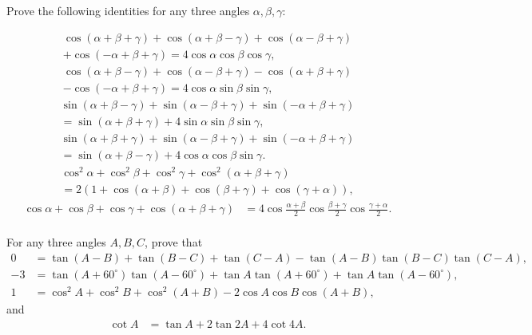 \documentclass[12pt,a4paper]{memoir}
\theoremstyle{definition}
\begin{document}
\begin{question}
	Prove the following identities for any three angles $\alpha, \beta, \gamma$:
	\begin{tasks}
		\task \begin{multline*}
			\cos(\alpha+\beta+\gamma)+\cos(\alpha+\beta-\gamma)+\cos(\alpha-\beta+\gamma)\\+\cos(-\alpha+\beta+\gamma)  = 4\cos \alpha \cos \beta \cos \gamma,
		\end{multline*}
		\task \begin{multline*}
			\cos(\alpha+\beta-\gamma)+\cos(\alpha-\beta+\gamma)-\cos(\alpha+\beta+\gamma) \\- \cos(-\alpha+\beta+\gamma) = 4\cos \alpha \sin \beta \sin \gamma,
		\end{multline*}
		\task \begin{multline*}
			\sin(\alpha+\beta-\gamma)+\sin(\alpha-\beta+\gamma)+\sin(-\alpha+\beta+\gamma) \\= \sin(\alpha+\beta+\gamma) + 4\sin \alpha \sin \beta \sin \gamma,
		\end{multline*}
		\task \begin{multline*}
			\sin(\alpha+\beta+\gamma)+\sin(\alpha-\beta+\gamma)+\sin(-\alpha+\beta+\gamma) \\= \sin(\alpha+\beta-\gamma) + 4\cos \alpha \cos \beta \sin \gamma.
		\end{multline*}
		\task \begin{multline*}
			\cos^2 \alpha + \cos^2 \beta + \cos^2 \gamma + \cos^2(\alpha+\beta+\gamma) \\= 2\left(1+\cos(\alpha+\beta)+\cos(\beta+\gamma)+\cos(\gamma+\alpha)\right),
		\end{multline*}
		\task \begin{align*}
			\cos \alpha + \cos \beta + \cos \gamma + \cos(\alpha+\beta+\gamma) &= 4\cos\frac{\alpha+\beta}{2}\cos\frac{\beta+\gamma}{2}\cos\frac{\gamma+\alpha}{2}.\\
		\end{align*}
	\end{tasks}
\end{question}


\begin{question}
	For any three angles $A,B,C$, prove that
	\begin{align*}
		0  &= \tan(A-B)+\tan(B-C)+\tan(C-A)-\tan(A-B)\tan(B-C)\tan(C-A),\\
		-3 &= \tan(A+60^{\circ})\tan(A-60^{\circ}) + \tan A \tan(A+60^{\circ}) + \tan A \tan(A-60^{\circ}),\\
		1  &= \cos^2 A + \cos^2 B + \cos^2 (A+B) - 2 \cos A \cos B \cos(A+B),
	\end{align*}
	and
	\begin{align*}
		\cot A &=\tan A + 2\tan 2A + 4 \cot 4A.
	\end{align*}
\end{question}
\end{document}

